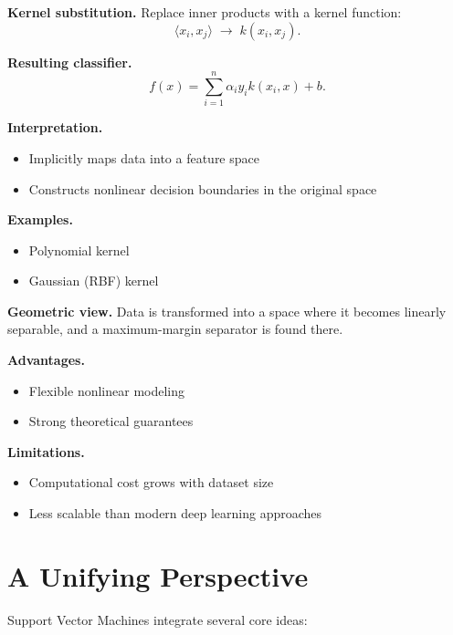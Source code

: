 \medskip

\noindent
\textbf{Kernel substitution.}  
Replace inner products with a kernel function:
\[
\langle x_i, x_j \rangle \;\rightarrow\; k(x_i, x_j).
\]

\medskip

\noindent
\textbf{Resulting classifier.}
\[
f(x) = \sum_{i=1}^n \alpha_i y_i k(x_i, x) + b.
\]

\medskip

\noindent
\textbf{Interpretation.}
\begin{itemize}
    \item Implicitly maps data into a feature space
    \item Constructs nonlinear decision boundaries in the original space
\end{itemize}

\medskip

\noindent
\textbf{Examples.}
\begin{itemize}
    \item Polynomial kernel
    \item Gaussian (RBF) kernel
\end{itemize}

\medskip

\noindent
\textbf{Geometric view.}  
Data is transformed into a space where it becomes linearly separable, and a maximum-margin separator is found there.

\medskip

\noindent
\textbf{Advantages.}
\begin{itemize}
    \item Flexible nonlinear modeling
    \item Strong theoretical guarantees
\end{itemize}

\medskip

\noindent
\textbf{Limitations.}
\begin{itemize}
    \item Computational cost grows with dataset size
    \item Less scalable than modern deep learning approaches
\end{itemize}

\section{A Unifying Perspective}

Support Vector Machines integrate several core ideas:

